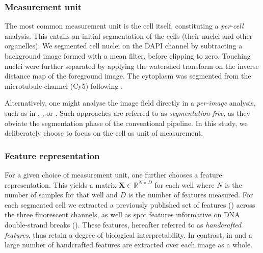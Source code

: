 
\subsubsection{Measurement unit}
\label{subsubsec:unit}

The most common measurement unit is the cell itself, constituting a \emph{per-cell} analysis. This entails an initial segmentation of the cells (their nuclei and other organelles). We segmented cell nuclei on the DAPI channel by subtracting a background image formed with a mean filter, before clipping to zero. Touching nuclei were further separated by applying the watershed transform on the inverse distance map of the foreground image. The cytoplasm was segmented from the microtubule channel (Cy5) following \cite{jones2005voronoi}. 

Alternatively, one might analyse the image field directly in a \emph{per-image} analysis, such as in \cite{orlov2008wnd}, \cite{uhlmann2016cp}, or \cite{godinez2017multi}. Such approaches are referred to as \emph{segmentation-free}, as they obviate the segmentation phase of the conventional pipeline. In this study, we deliberately choose to focus on the cell as unit of measurement. 

\subsubsection{Feature representation}
\label{subsubsec:representation}

For a given choice of measurement unit, one further chooses a feature representation. This yields a matrix $\mathbf{X} \in \mathbb{R}^{N \times D}$ for each well where $N$ is the number of samples for that well and $D$ is the number of features measured. For each segmented cell we extracted a previously published set of features (\cite{Walter2010}) across the three fluorescent channels, as well as spot features informative on DNA double-strand breaks (\cite{boyd2018analysing}). These features, hereafter referred to as \emph{handcrafted features}, thus retain a degree of biological interpretability. In contrast, in \cite{orlov2008wnd} and \cite{uhlmann2016cp} a large number of handcrafted features are extracted over each image as a whole.

